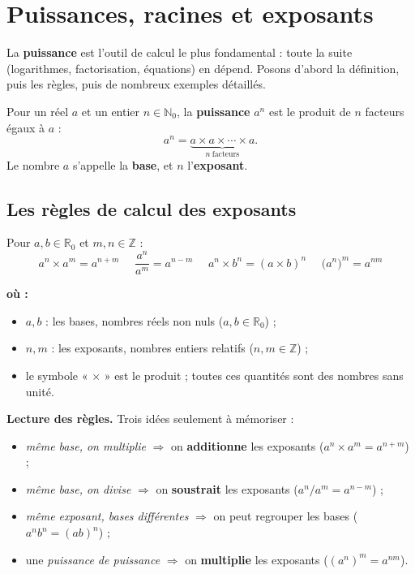 \documentclass[11pt,a4paper]{article}
\newenvironment{ou}{%
  \par\smallskip\noindent\textbf{où :}\nopagebreak
  \begin{itemize}[leftmargin=1.8em,topsep=2pt,itemsep=1.5pt,parsep=0pt]}%
  {\end{itemize}}
\newcommand{\R}{\mathbb{R}}
\newcommand{\N}{\mathbb{N}}
\newcommand{\Z}{\mathbb{Z}}
\begin{document}
\section{Puissances, racines et exposants}
La \textbf{puissance} est l'outil de calcul le plus fondamental : toute la suite (logarithmes,
factorisation, équations) en dépend. Posons d'abord la définition, puis les règles, puis de
nombreux exemples détaillés.

\begin{definition}
Pour un réel $a$ et un entier $n\in\N_0$, la \textbf{puissance} $a^{n}$ est le produit de $n$ facteurs
égaux à $a$ :
\[ a^{n}=\underbrace{a\times a\times\cdots\times a}_{n\ \text{facteurs}}. \]
Le nombre $a$ s'appelle la \textbf{base}, et $n$ l'\textbf{exposant}.
\end{definition}

\subsection{Les règles de calcul des exposants}

\begin{formule}
Pour $a,b\in\R_0$ et $m,n\in\Z$ :
\[ \boxed{\,a^{n}\times a^{m}=a^{n+m}\,}\quad
   \boxed{\,\dfrac{a^{n}}{a^{m}}=a^{n-m}\,}\quad
   \boxed{\,a^{n}\times b^{n}=(a\times b)^{n}\,}\quad
   \boxed{\,\bigl(a^{n}\bigr)^{m}=a^{nm}\,} \]
\begin{ou}
  \item $a,b$ : les bases, nombres réels non nuls ($a,b\in\R_0$) ;
  \item $n,m$ : les exposants, nombres entiers relatifs ($n,m\in\Z$) ;
  \item le symbole « $\times$ » est le produit ; toutes ces quantités sont des nombres sans unité.
\end{ou}
\end{formule}

\noindent\textbf{Lecture des règles.} Trois idées seulement à mémoriser :
\begin{itemize}[leftmargin=1.6em,topsep=2pt]
  \item \emph{même base, on multiplie} $\Rightarrow$ on \textbf{additionne} les exposants ($a^n\times a^m=a^{n+m}$) ;
  \item \emph{même base, on divise} $\Rightarrow$ on \textbf{soustrait} les exposants ($a^n/a^m=a^{n-m}$) ;
  \item \emph{même exposant, bases différentes} $\Rightarrow$ on peut regrouper les bases ($a^n b^n=(ab)^n$) ;
  \item une \emph{puissance de puissance} $\Rightarrow$ on \textbf{multiplie} les exposants ($(a^n)^m=a^{nm}$).
\end{itemize}
\end{document}
